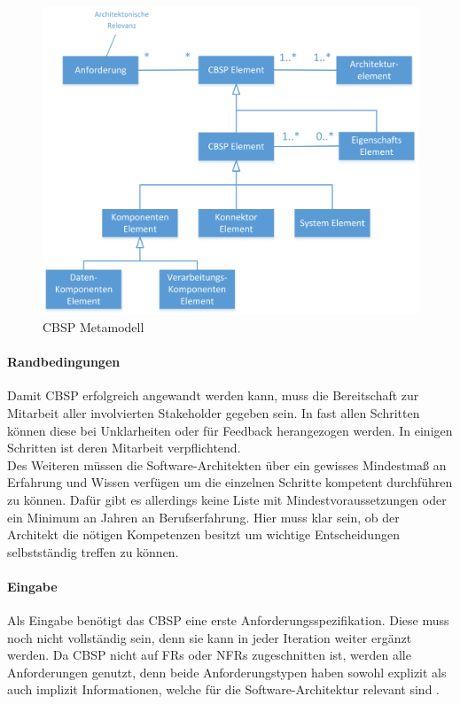 \begin{figure}[h]
	\centering
	\includegraphics[scale=0.6]{cbsp_meta_model.png} 
	\caption{CBSP Metamodell \cite{Gru01}}
	\label{fig_cbsp_meta_model}
\end{figure}

\paragraph{Randbedingungen}

Damit CBSP erfolgreich angewandt werden kann, muss die Bereitschaft zur Mitarbeit aller involvierten Stakeholder gegeben sein. In fast allen Schritten k\"onnen diese bei Unklarheiten oder f\"ur Feedback herangezogen werden. In einigen Schritten ist deren Mitarbeit verpflichtend. \\
Des Weiteren m\"ussen die Software-Architekten \"uber ein gewisses Mindestma\ss{} an Erfahrung und Wissen verf\"ugen um die einzelnen Schritte kompetent durchf\"uhren zu k\"onnen. Daf\"ur gibt es allerdings keine Liste mit Mindestvoraussetzungen oder ein Minimum an Jahren an Berufserfahrung. Hier muss klar sein, ob der Architekt die n\"otigen Kompetenzen besitzt um wichtige Entscheidungen selbstst\"andig treffen zu k\"onnen. \\

\paragraph{Eingabe}

Als Eingabe ben\"otigt das CBSP eine erste Anforderungsspezifikation. Diese muss noch nicht vollst\"andig sein, denn sie kann in jeder Iteration weiter erg\"anzt werden. Da CBSP nicht auf FRs oder NFRs zugeschnitten ist, werden alle Anforderungen genutzt, denn beide Anforderungstypen haben sowohl explizit als auch implizit Informationen, welche f\"ur die Software-Architektur relevant sind \cite{Gru01}. \\


